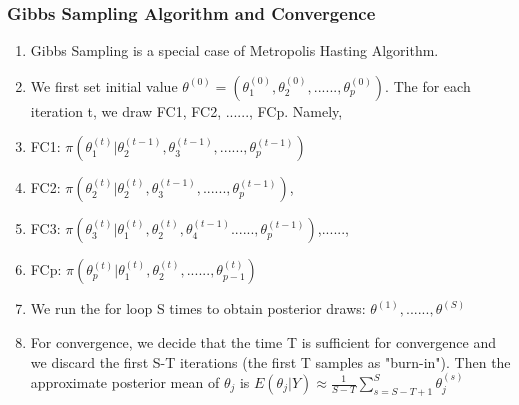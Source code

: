 \documentclass{beamer}
\begin{document}

\begin{frame}
\frametitle{Gibbs Sampling Algorithm and Convergence}

\begin{enumerate}
\item Gibbs Sampling is a special case of Metropolis Hasting Algorithm.

\item We first set initial value $\theta^{(0)} = (\theta_1^{(0)}, \theta_2^{(0)},......, \theta_p^{(0)})$. The for each iteration t, we draw FC1, FC2, ......, FCp. Namely, 

\item FC1: $\pi(\theta_1^{(t)}|\theta_2^{(t-1)}, \theta_3^{(t-1)},......,\theta_p^{(t-1)})$
\item FC2: $\pi(\theta_2^{(t)}|\theta_2^{(t)}, \theta_3^{(t-1)},......,\theta_p^{(t-1)})$, 
\item FC3: $\pi(\theta_3^{(t)}|\theta_1^{(t)}, \theta_2^{(t)},\theta_4^{(t-1)}......,\theta_p^{(t-1)})$,......, 
\item FCp: $\pi(\theta_p^{(t)}|\theta_1^{(t)}, \theta_2^{(t)},......,\theta_{p-1}^{(t)})$

\item We run the for loop S times to obtain posterior draws: $\theta^{(1)}, ......, \theta^{(S)}$

\item For convergence, we decide that the time T is sufficient for convergence and we discard the first S-T iterations (the first T samples as "burn-in"). Then the approximate posterior mean of $\theta_j$ is $E(\theta_j|Y) \approx \frac{1}{S-T} \sum_{s = S-T+1}^S \theta_j^{(s)}$

\end{enumerate}

\end{frame}

\end{document}
